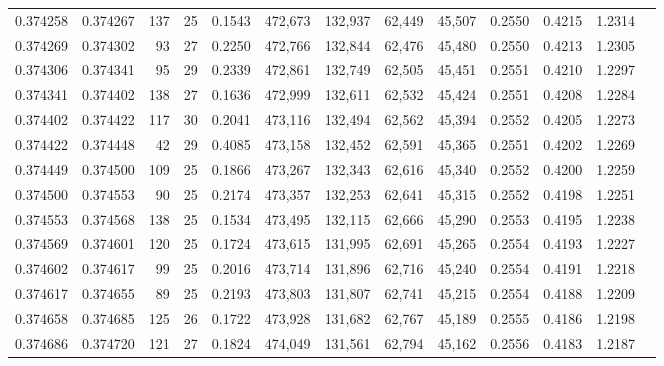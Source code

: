 \begin{tabular}{rrrrrrrrrrrrr}
0.374258 & 0.374267 &   137 &  25 &                                     0.1543 & 472,673 & 132,937 &  62,449 &  45,507 & 0.2550 & 0.4215 & 1.2314 \\
0.374269 & 0.374302 &    93 &  27 &                                     0.2250 & 472,766 & 132,844 &  62,476 &  45,480 & 0.2550 & 0.4213 & 1.2305 \\
0.374306 & 0.374341 &    95 &  29 &                                     0.2339 & 472,861 & 132,749 &  62,505 &  45,451 & 0.2551 & 0.4210 & 1.2297 \\
0.374341 & 0.374402 &   138 &  27 &                                     0.1636 & 472,999 & 132,611 &  62,532 &  45,424 & 0.2551 & 0.4208 & 1.2284 \\
0.374402 & 0.374422 &   117 &  30 &                                     0.2041 & 473,116 & 132,494 &  62,562 &  45,394 & 0.2552 & 0.4205 & 1.2273 \\
0.374422 & 0.374448 &    42 &  29 &                                     0.4085 & 473,158 & 132,452 &  62,591 &  45,365 & 0.2551 & 0.4202 & 1.2269 \\
0.374449 & 0.374500 &   109 &  25 &                                     0.1866 & 473,267 & 132,343 &  62,616 &  45,340 & 0.2552 & 0.4200 & 1.2259 \\
0.374500 & 0.374553 &    90 &  25 &                                     0.2174 & 473,357 & 132,253 &  62,641 &  45,315 & 0.2552 & 0.4198 & 1.2251 \\
0.374553 & 0.374568 &   138 &  25 &                                     0.1534 & 473,495 & 132,115 &  62,666 &  45,290 & 0.2553 & 0.4195 & 1.2238 \\
0.374569 & 0.374601 &   120 &  25 &                                     0.1724 & 473,615 & 131,995 &  62,691 &  45,265 & 0.2554 & 0.4193 & 1.2227 \\
0.374602 & 0.374617 &    99 &  25 &                                     0.2016 & 473,714 & 131,896 &  62,716 &  45,240 & 0.2554 & 0.4191 & 1.2218 \\
0.374617 & 0.374655 &    89 &  25 &                                     0.2193 & 473,803 & 131,807 &  62,741 &  45,215 & 0.2554 & 0.4188 & 1.2209 \\
0.374658 & 0.374685 &   125 &  26 &                                     0.1722 & 473,928 & 131,682 &  62,767 &  45,189 & 0.2555 & 0.4186 & 1.2198 \\
0.374686 & 0.374720 &   121 &  27 &                                     0.1824 & 474,049 & 131,561 &  62,794 &  45,162 & 0.2556 & 0.4183 & 1.2187 \\

\end{tabular}

